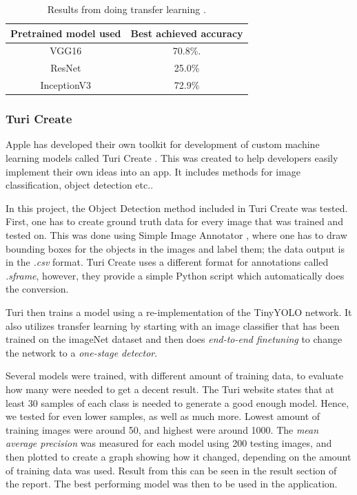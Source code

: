 \begin{table}[h]
\centering
\begin{tabular}{ |c|c| } 
 \hline
 Pretrained model used &  Best achieved accuracy  \\ 
 \hline
 VGG16 & 70.8\%. \\ 
 \hline
 ResNet & 25.0\% \\ 
  \hline
 InceptionV3 & 72.9\% \\ 
 \hline
\end{tabular}
\caption{Results from doing transfer learning .}
\label{table:transferLearning}
\end{table}

\subsubsection{Turi Create}
Apple has developed their own toolkit for development of custom machine learning models called Turi Create \cite{turiCreate}. This was created to help developers easily implement their own ideas into an app. It includes methods for image classification, object detection etc.. 

In this project, the Object Detection method included in Turi Create was tested. First, one
 has to create ground truth data for every image that was trained and tested on. This was
 done using Simple Image Annotator \cite{simpleImage}, where one has to draw bounding
  boxes for the objects in the images and label them; the data output is in the \textit{.csv} format.  Turi Create uses a different format for annotations called \textit{.sframe},
  however, they provide a simple Python script which automatically does the conversion. 

Turi then trains a model using a re-implementation of the TinyYOLO network. It also utilizes transfer learning by starting with an image classifier that has been trained on the imageNet dataset and then does \textit{end-to-end finetuning} to change the network to a \textit{one-stage detector}.

Several models were trained, with different amount of training data, to evaluate how many
 were needed to get a decent result. The Turi website states that at least 30 samples of
each class is needed to generate a good enough model. Hence, we tested for even lower
samples, as well as much more. Lowest amount of training images were around 50, and
highest  were around 1000. The \textit{mean average precision} was measured for each model using 200 testing images, and then plotted to create a graph showing how it
 changed, depending on the amount of training data was used. Result from this can be
 seen in the result section of the report. The best performing model was then to be used in the application.


